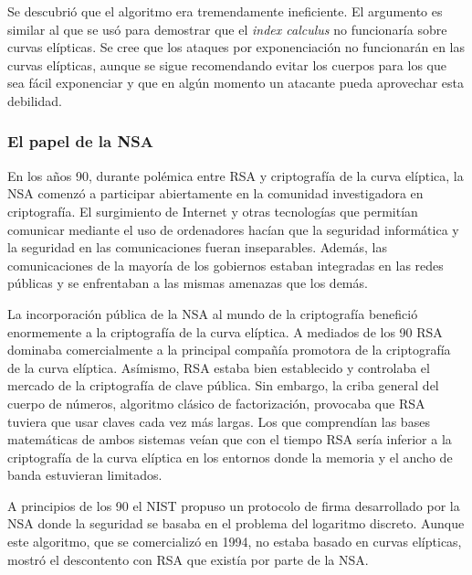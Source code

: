\documentclass[
  a4paper,
  12pt,
  spanish,
]{scrartcl}
\begin{document}
Se descubrió que el algoritmo era tremendamente ineficiente. El argumento es similar al que se usó para demostrar que el \textit{index calculus} no funcionaría sobre curvas elípticas. Se cree que los ataques por exponenciación no funcionarán en las curvas elípticas, aunque se sigue recomendando evitar los cuerpos para los que sea fácil exponenciar y que en algún momento un atacante pueda aprovechar esta debilidad.

\subsubsection{El papel de la NSA}
En los años 90, durante polémica entre RSA y criptografía de la curva elíptica, la NSA comenzó a participar abiertamente en la comunidad investigadora en criptografía. El surgimiento de Internet y otras tecnologías que permitían comunicar mediante el uso de ordenadores hacían que la seguridad informática y la seguridad en las comunicaciones fueran inseparables. Además, las comunicaciones de la mayoría de los gobiernos estaban integradas en las redes públicas y se enfrentaban a las mismas amenazas que los demás.

La incorporación pública de la NSA al mundo de la criptografía benefició enormemente a la criptografía de la curva elíptica. A mediados de los 90 RSA dominaba comercialmente a la principal compañía promotora de la criptografía de la curva elíptica. Asímismo, RSA estaba bien establecido y controlaba el mercado de la criptografía de clave pública. Sin embargo, la criba general del cuerpo de números, algoritmo clásico de factorización, provocaba que RSA tuviera que usar claves cada vez más largas. Los que comprendían las bases matemáticas de ambos sistemas veían que con el tiempo RSA sería inferior a la criptografía de la curva elíptica en los entornos donde la memoria y el ancho de banda estuvieran limitados.

A principios de los 90 el NIST propuso un protocolo de firma desarrollado por la NSA donde la seguridad se basaba en el problema del logaritmo discreto. Aunque este algoritmo, que se comercializó en 1994, no estaba basado en curvas elípticas, mostró el descontento con RSA que existía por parte de la NSA.
\end{document}
